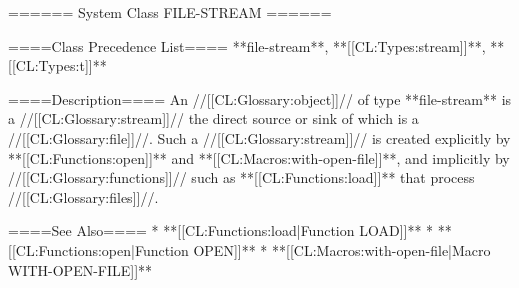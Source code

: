 ====== System Class FILE-STREAM ======

====Class Precedence List====
**file-stream**, **[[CL:Types:stream]]**, **[[CL:Types:t]]**

====Description====
An //[[CL:Glossary:object]]// of type **file-stream** is a //[[CL:Glossary:stream]]// the direct source or sink of which is a //[[CL:Glossary:file]]//. Such a //[[CL:Glossary:stream]]// is created explicitly by **[[CL:Functions:open]]** and **[[CL:Macros:with-open-file]]**, and implicitly by //[[CL:Glossary:functions]]// such as **[[CL:Functions:load]]** that process //[[CL:Glossary:files]]//.

====See Also====
  * **[[CL:Functions:load|Function LOAD]]**
  * **[[CL:Functions:open|Function OPEN]]**
  * **[[CL:Macros:with-open-file|Macro WITH-OPEN-FILE]]**

 
